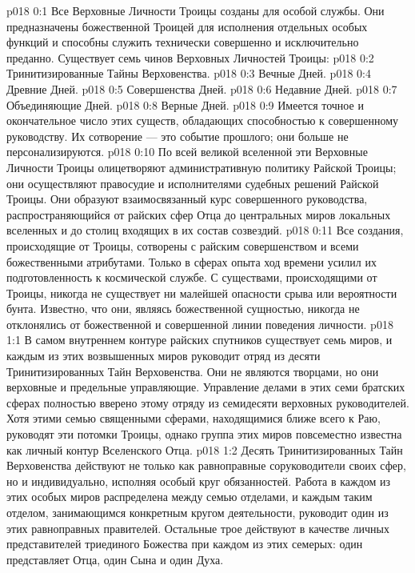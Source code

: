 \author{Божественный Советник}
\vs p018 0:1 Все Верховные Личности Троицы созданы для особой службы. Они предназначены божественной Троицей для исполнения отдельных особых функций и способны служить технически совершенно и исключительно преданно. Существует семь чинов Верховных Личностей Троицы:
\vs p018 0:2 \bibnobreakspace Тринитизированные Тайны Верховенства.
\vs p018 0:3 \bibnobreakspace Вечные Дней.
\vs p018 0:4 \bibnobreakspace Древние Дней.
\vs p018 0:5 \bibnobreakspace Совершенства Дней.
\vs p018 0:6 \bibnobreakspace Недавние Дней.
\vs p018 0:7 \bibnobreakspace Объединяющие Дней.
\vs p018 0:8 \bibnobreakspace Верные Дней.
\vs p018 0:9 \pc Имеется точное и окончательное число этих существ, обладающих способностью к совершенному руководству. Их сотворение --- это событие прошлого; они больше не персонализируются.
\vs p018 0:10 По всей великой вселенной эти Верховные Личности Троицы олицетворяют административную политику Райской Троицы; они осуществляют правосудие и  исполнителями судебных решений Райской Троицы. Они образуют взаимосвязанный курс совершенного руководства, распространяющийся от райских сфер Отца до центральных миров локальных вселенных и до столиц входящих в их состав созвездий.
\vs p018 0:11 Все создания, происходящие от Троицы, сотворены с райским совершенством и всеми божественными атрибутами. Только в сферах опыта ход времени усилил их подготовленность к космической службе. С существами, происходящими от Троицы, никогда не существует ни малейшей опасности срыва или вероятности бунта. Известно, что они, являясь божественной сущностью, никогда не отклонялись от божественной и совершенной линии поведения личности.
\vs p018 1:1 В самом внутреннем контуре райских спутников существует семь миров, и каждым из этих возвышенных миров руководит отряд из десяти Тринитизированных Тайн Верховенства. Они не являются творцами, но они верховные и предельные управляющие. Управление делами в этих семи братских сферах полностью вверено этому отряду из семидесяти верховных руководителей. Хотя этими семью священными сферами, находящимися ближе всего к Раю, руководят эти потомки Троицы, однако группа этих миров повсеместно известна как личный контур Вселенского Отца.
\vs p018 1:2 Десять Тринитизированных Тайн Верховенства действуют не только как равноправные соруководители своих сфер, но и индивидуально, исполняя особый круг обязанностей. Работа в каждом из этих особых миров распределена между семью отделами, и каждым таким отделом, занимающимся конкретным кругом деятельности, руководит один из этих равноправных правителей. Остальные трое действуют в качестве личных представителей триединого Божества при каждом из этих семерых: один представляет Отца, один Сына и один Духа.
